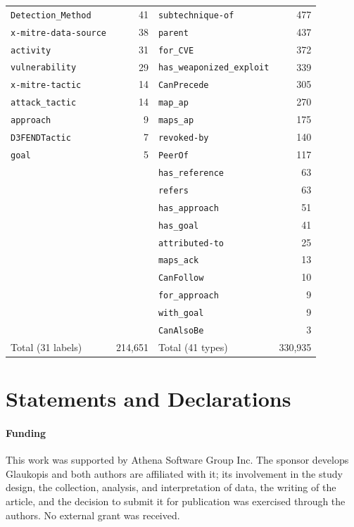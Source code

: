 \documentclass[twocolumn]{svjour3}
\begin{document}
\begin{appendix}
\begin{table}
\begin{tabular}{@{}lr@{\qquad}lr@{}}
\texttt{Detection\_Method} & 41 & \texttt{subtechnique-of} & 477 \\
\texttt{x-mitre-data-source} & 38 & \texttt{parent} & 437 \\
\texttt{activity} & 31 & \texttt{for\_CVE} & 372 \\
\texttt{vulnerability} & 29 & \texttt{has\_weaponized\_exploit} & 339 \\
\texttt{x-mitre-tactic} & 14 & \texttt{CanPrecede} & 305 \\
\texttt{attack\_tactic} & 14 & \texttt{map\_ap} & 270 \\
\texttt{approach} & 9 & \texttt{maps\_ap} & 175 \\
\texttt{D3FENDTactic} & 7 & \texttt{revoked-by} & 140 \\
\texttt{goal} & 5 & \texttt{PeerOf} & 117 \\
& & \texttt{has\_reference} & 63 \\
& & \texttt{refers} & 63 \\
& & \texttt{has\_approach} & 51 \\
& & \texttt{has\_goal} & 41 \\
& & \texttt{attributed-to} & 25 \\
& & \texttt{maps\_ack} & 13 \\
& & \texttt{CanFollow} & 10 \\
& & \texttt{for\_approach} & 9 \\
& & \texttt{with\_goal} & 9 \\
& & \texttt{CanAlsoBe} & 3 \\
\midrule Total (31 labels) & 214,651 & Total (41 types) & 330,935 \\\bottomrule
\end{tabular}
\end{table}
\end{appendix}

\section*{Statements and Declarations}
\paragraph{Funding}
This work was supported by Athena Software Group Inc. The sponsor develops Glaukopis and both authors are affiliated with it; its involvement in the study design, the collection, analysis, and interpretation of data, the writing of the article, and the decision to submit it for publication was exercised through the authors. No external grant was received.
\end{document}
